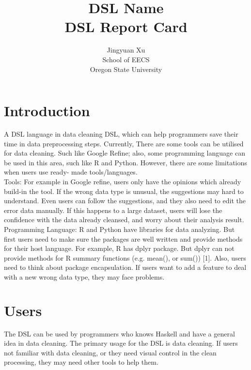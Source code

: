 \documentclass[11pt]{article}
\begin{document}
\title{\textbf{DSL Name}
\\ DSL Report Card}

\author{Jingyuan Xu \\
School of EECS \\ 
Oregon State University
}

\maketitle


\section{Introduction}
\label{sec:intro}

A DSL language in data cleaning DSL, which can help programmers save their time in data preprocessing steps. Currently, There are some tools can be utilised for data cleaning. Such like Google Refine; also, some programming language can be used in this area, such like R and Python. However, there are some limitations when users use ready- made tools/languages. \\
Tools: For example in Google refine, users only have the opinions which already build-in the tool. If the wrong data type is unusual, the suggestions may hard to understand. Even users can follow the suggestions, and they also need to edit the error data manually. If this happens to a large dataset, users will lose the confidence with the data already cleansed, and worry about their analysis result. \\
Programming Language: R and Python have libraries for data analyzing. But first users need to make sure the packages are well written and provide methods for their host language. For example,  R has dplyr package. But dplyr can not provide methods for R summary functions (e.g. mean(), or sum()) [1]. Also, users need to think about package encapsulation. If users want to add a  feature to deal with a new wrong data type,  they may face problems. \\

\section{Users}
\label{sec:users}

The DSL can be used by programmers who knows Haskell and have a general idea in data cleaning. The primary usage for the DSL is data cleaning. If users not familiar with data cleaning, or they need visual control in the clean processing, they may need other tools to help them.\\
\end{document}
